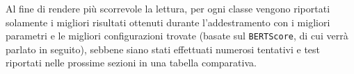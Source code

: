 Al fine di rendere più scorrevole la lettura, per ogni classe vengono riportati solamente i migliori risultati ottenuti durante l'addestramento con i migliori parametri e le migliori configurazioni trovate (basate sul \texttt{BERTScore}, di cui verrà parlato in seguito), sebbene
siano stati effettuati numerosi tentativi e test riportati nelle prossime sezioni in una tabella comparativa.\\





%

